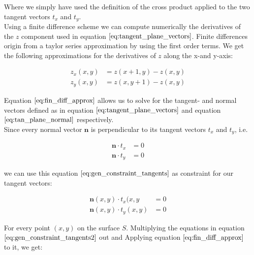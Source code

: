 \documentclass{paper}
\begin{document}
Where we simply have used the definition of the cross product applied to the two tangent vectors $t_x$ and $t_y$. \\

Using a finite difference scheme we can compute numerically the derivatives of the $z$ component used in equation $\ref{eq:tangent_plane_vectors}$. Finite differences origin from a taylor series approximation by using the first order terms. We get the following approximations for the derivatives of $z$ along the x-and y-axis:

\begin{align}
    z_x(x,y) &= z(x+1,y) - z(x,y) \nonumber \\
    z_y(x,y) &= z(x,y+1) - z(x,y)
\label{eq:fin_diff_approx}
\end{align}

Equation $\ref{eq:fin_diff_approx}$ allows us to solve for the tangent- and normal vectors defined as in equation $\ref{eq:tangent_plane_vectors}$ and equation $\ref{eq:tan_plane_normal}$ respectively. \\

Since every normal vector $\textbf{n}$ is perpendicular to its tangent vectors $t_x$ and $t_y$, i.e.

\begin{align}
    \textbf{n} \cdot t_x &= 0 \nonumber \\
    \textbf{n} \cdot t_y &= 0
\label{eq:gen_constraint_tangents}
\end{align}

we can use this equation $\ref{eq:gen_constraint_tangents}$ as constraint for our tangent vectors:

\begin{align}
    \textbf{n}(x,y) \cdot t_x(x,y &= 0 \nonumber \\
    \textbf{n}(x,y) \cdot t_y(x,y) &= 0
\label{eq:gen_constraint_tangents2}
\end{align}

For every point $(x,y)$ on the surface $S$. Multiplying the equations in equation $\ref{eq:gen_constraint_tangents2}$ out and Applying equation $\ref{eq:fin_diff_approx}$ to it, we get:
\end{document}

